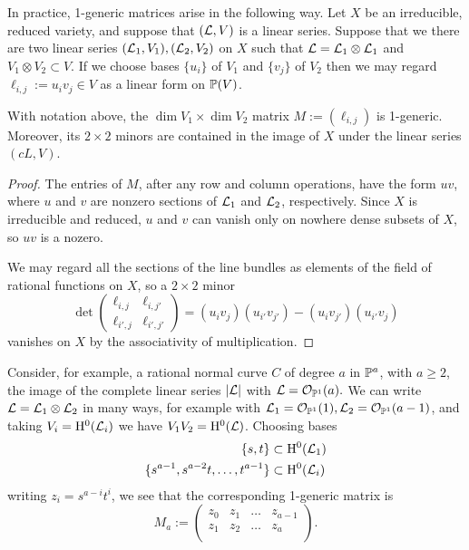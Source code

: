 In practice, 1-generic matrices arise in the following way. Let $X$ be
an irreducible, reduced variety, and suppose that $(\cL, V)$ is a linear series. Suppose that we there are two linear series $(\cL_1,V_1),  (\cL_2,V_2)$ on $X$
such that $\cL = \cL_1\otimes\cL_1$ and $V_1\otimes V_2 \subset V$. If we
choose
bases $\{u_i\}$ of $V_1$ and $\{v_j\}$ of $V_2$ then we may regard $\ell_{i,j}:=u_iv_j\in V$
as a linear form on $\PP(V)$.

\begin{proposition}\label{some generators}
 With notation above, the $\dim V_1 \times \dim V_2$ matrix 
$M :=  (\ell_{i,j})$ is 1-generic. Moreover, its $2\times 2$ minors are contained in 
the image of $X$ under the linear series $(cL, V)$.
\end{proposition}

\begin{proof}
The entries of $M$, after any row and column operations, have the form $uv$, where
$u$ and $v$ are nonzero sections of $\cL_1$ and $\cL_2$, respectively. Since $X$ is irreducible and reduced, $u$ and $v$ can vanish only on nowhere dense subsets of $X$, so $uv$ is a nozero.

We may regard all the sections of the line bundles as elements of the 
field of rational functions on $X$, so a $2\times 2$ minor 
$$
\det
\begin{pmatrix}
 \ell_{i,j}&\ell_{i,j'} \\
 \ell_{i',j}&\ell_{i',j'}
\end{pmatrix}
= (u_iv_j)(u_{i'}v_{j'}) - (u_{i}v_{j'}) (u_{i'}v_{j})
$$
vanishes on $X$ by the associativity of multiplication.
\end{proof}

Consider, for example, a rational normal curve $C$ of degree $a$ in $\PP^a$, with $a\geq 2$, 
the image of the complete linear series $|\cL|$ with $\cL = \cO_{\PP^1}(a).$ 
We can  write $\cL = \cL_1\otimes \cL_2$ in many ways, for example with
$\cL_1 = \cO_{\PP^1}(1), \cL_2 = \cO_{\PP^1}(a-1)$, and taking
$V_i = \HH^0(\cL_i)$ we have $V_1V_2 = \HH^0(\cL)$. Choosing bases
\begin{align*}
\{s,t\} &\subset   \HH^0(\cL_1)\\
\{s^{a-1}, s^{a-2}t, \dots, t^{a-1}\} &\subset \HH^0(\cL_i)\\
\end{align*}
writing $z_i = s^{a-i}t^i$, we see that the corresponding 1-generic matrix is
$$
M_a:= \begin{pmatrix}
 z_0&z_1&\dots&z_{a-1}\\
 z_1&z_2&\dots&z_{a}\\
\end{pmatrix}.
$$


